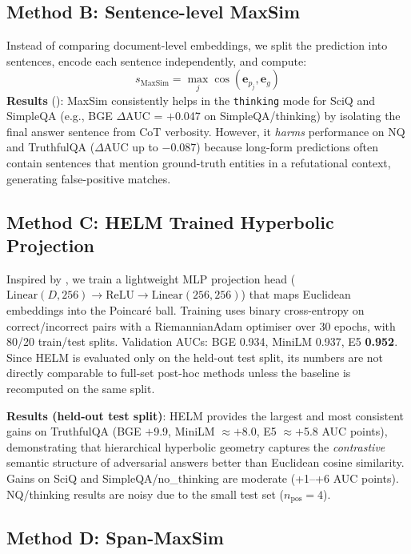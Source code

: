 \documentclass{article}
\begin{document}
\subsection{Method B: Sentence-level MaxSim}

Instead of comparing document-level embeddings, we split the prediction into
sentences, encode each sentence independently, and compute:
\begin{equation}
  s_{\text{MaxSim}} = \max_{j} \cos(\mathbf{e}_{p_j}, \mathbf{e}_g)
\end{equation}
\textbf{Results} ():
MaxSim consistently helps in the \texttt{thinking} mode for SciQ and SimpleQA
(e.g., BGE $\Delta$AUC = $+$0.047 on SimpleQA/thinking) by isolating the final
answer sentence from CoT verbosity.
However, it \emph{harms} performance on NQ and TruthfulQA ($\Delta$AUC up to
$-$0.087) because long-form predictions often contain sentences that mention
ground-truth entities in a refutational context, generating false-positive matches.

\subsection{Method C: HELM Trained Hyperbolic Projection}

Inspired by \citet{he2025helm}, we train a lightweight MLP projection head
($\text{Linear}(D, 256) \to \text{ReLU} \to \text{Linear}(256, 256)$) that maps
Euclidean embeddings into the Poincaré ball.
Training uses binary cross-entropy on correct/incorrect pairs with a
RiemannianAdam optimiser over 30 epochs, with 80/20 train/test splits.
Validation AUCs: BGE 0.934, MiniLM 0.937, E5 \textbf{0.952}.
Since HELM is evaluated only on the held-out test split, its numbers are not
directly comparable to full-set post-hoc methods unless the baseline is recomputed
on the same split.

\textbf{Results (held-out test split)}: HELM provides the largest and most
consistent gains on TruthfulQA (BGE $+$9.9, MiniLM $\approx$$+$8.0,
E5 $\approx$$+$5.8 AUC points), demonstrating that hierarchical hyperbolic geometry
captures the \emph{contrastive} semantic structure of adversarial answers better than
Euclidean cosine similarity.
Gains on SciQ and SimpleQA/no\_thinking are moderate (+1--+6 AUC points).
NQ/thinking results are noisy due to the small test set ($n_{\text{pos}}=4$).

\subsection{Method D: Span-MaxSim}
\end{document}
